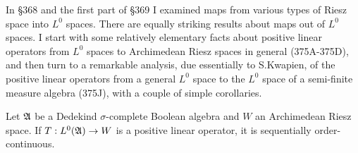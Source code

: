 
\def\ssbhm{$\sigma$-\vthsp{}subhomomorphism}

\def\chaptername{Linear operators between function spaces}
\def\sectionname{Kwapien's theorem}


In \S368 and the first part of \S369 I examined maps from various types
of Riesz space into $L^0$
spaces.   There are equally striking results about maps out of $L^0$
spaces.   I start with some relatively elementary facts about positive
linear operators from $L^0$ spaces to Archimedean Riesz spaces in
general (375A-375D), and then turn to a remarkable analysis, due
essentially to S.Kwapien, of the positive linear operators from a
general $L^0$ space
to the $L^0$ space of a semi-finite measure algebra (375J), with a
couple of simple corollaries.

 Let $\frak A$ be a Dedekind $\sigma$-complete
Boolean algebra and $W$ an Archimedean Riesz space.   If
$T:L^0(\frak A)\to W$ is a positive linear operator, it is sequentially
order-continuous.

